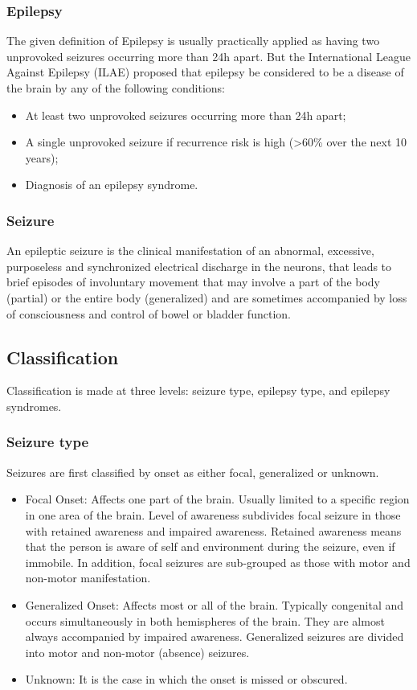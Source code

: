  \subsubsection*{Epilepsy}
  The given definition of Epilepsy is usually practically applied as having two unprovoked seizures occurring more than 24h apart. But the International League Against Epilepsy (ILAE) proposed that epilepsy be considered to be a disease of the brain by any of the following conditions: \cite{defEpilepsy}

  \begin{itemize}
    \item At least two unprovoked seizures occurring more than 24h apart;
    \item A single unprovoked seizure if recurrence risk is high (>60\% over the next 10 years);
    \item Diagnosis of an epilepsy syndrome.
  \end{itemize}
  \subsubsection*{Seizure}
  An epileptic seizure is the clinical manifestation of an abnormal, excessive, purposeless and synchronized electrical discharge in the neurons, that leads to brief episodes of involuntary movement that may involve a part of the body (partial) or the entire body (generalized) and are sometimes accompanied by loss of consciousness and control of bowel or bladder function. \cite{WHO}
  
  \subsection*{Classification}
  Classification is made at three levels: seizure type, epilepsy type, and epilepsy syndromes. \cite{classification}
  \subsubsection*{Seizure type}
  Seizures are first classified by onset as either focal, generalized or unknown.
  \begin{itemize}
    \item Focal Onset: Affects one part of the brain. Usually limited to a specific region in one area of the brain. Level of awareness subdivides focal seizure in those with retained awareness and impaired awareness. Retained awareness means that the person is aware of self and environment during the seizure, even if immobile. In addition, focal seizures are sub-grouped as those with motor and non-motor manifestation.
    \item Generalized Onset: Affects most or all of the brain. Typically congenital and occurs simultaneously in both hemispheres of the brain. They are almost always accompanied by impaired awareness. Generalized seizures are divided into motor and non-motor (absence) seizures.
    \item Unknown: It is the case in which the onset is missed or obscured. 
  \end{itemize}
  
